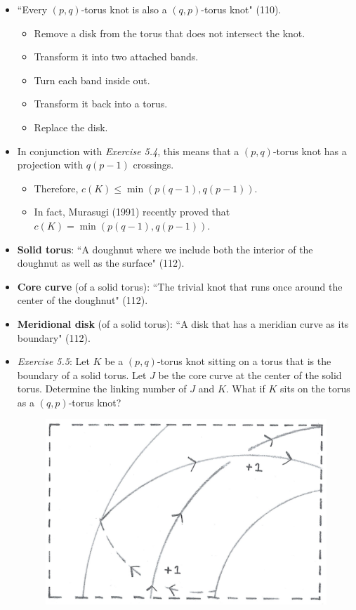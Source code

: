\documentclass[titlepage]{article}
\numberwithin{figure}{section}
\numberwithin{table}{section}
\numberwithin{equation}{section}
\newcommand{\dq}[2]{``#1" (#2).}
\begin{document}
\begin{itemize}
\begin{itemize}
    \end{itemize}
    \item \dq{Every $(p,q)$-torus knot is also a $(q,p)$-torus knot}{110}
    \begin{itemize}
        \item Remove a disk from the torus that does not intersect the knot.
        \item Transform it into two attached bands.
        \item Turn each band inside out.
        \item Transform it back into a torus.
        \item Replace the disk.
    \end{itemize}
    \item In conjunction with \emph{Exercise 5.4}, this means that a $(p,q)$-torus knot has a projection with $q(p-1)$ crossings.
    \begin{itemize}
        \item Therefore, $c(K)\leq \min\left( p(q-1),q(p-1) \right)$.
        \item In fact, Murasugi (1991) recently proved that $c(K)= \min\left( p(q-1),q(p-1) \right)$.
    \end{itemize}
    \item \textbf{Solid torus}: \dq{A doughnut where we include both the interior of the doughnut as well as the surface}{112}
    \item \textbf{Core curve} (of a solid torus): \dq{The trivial knot that runs once around the center of the doughnut}{112}
    \item \textbf{Meridional disk} (of a solid torus): \dq{A disk that has a meridian curve as its boundary}{112}
    \item \emph{Exercise 5.5}: Let $K$ be a $(p,q)$-torus knot sitting on a torus that is the boundary of a solid torus. Let $J$ be the core curve at the center of the solid torus. Determine the linking number of $J$ and $K$. What if $K$ sits on the torus as a $(q,p)$-torus knot?
    \begin{figure}[h!]
        \centering
        \includegraphics[width=0.4\linewidth]{Blender/ex5-5.png}

\end{figure}
\end{itemize}
\end{document}
